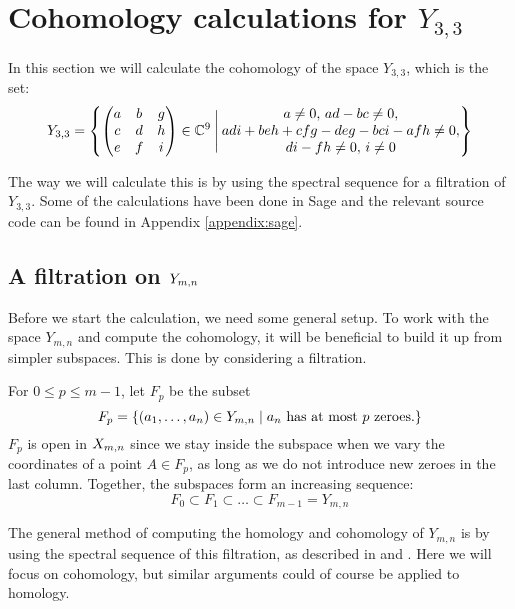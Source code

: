 


\chapter{Cohomology calculations for $Y_{3,3}$}
\label{chapter:udregninger}

In this section we will calculate the cohomology of the space
$Y_{3,3}$, which is the set:
\[ Y_{3,3} = \left\{ 
  \begin{pmatrix}
    a & b & g \\
    c & d & h \\
    e & f & i
  \end{pmatrix} \in \mathbb{C}^9 \:\Bigg\vert\: 
  \begin{matrix}
    a\neq 0,\, ad-bc \neq 0, \\
    adi+beh+cfg-deg-bci-afh \neq 0, \\
    di-fh \neq 0,\, i \neq 0
  \end{matrix}  \right\} \]

The way we will calculate this is by using the spectral sequence for
a filtration of $Y_{3,3}$. Some of the calculations have
been done in Sage and the relevant source code can be found in
Appendix \ref{appendix:sage}.

\section{A filtration on $Y_{m,n}$}

Before we start the calculation, we need some general setup. To work
with the space $Y_{m,n}$ and compute the cohomology, it will
be beneficial to build it up from simpler subspaces. This is done by
considering a filtration.

For $0 \leq p \leq m-1$, let $F_p$ be the subset
\[ F_p=\left\{  (a_1,\dots,a_n) \in Y_{m,n} \mid a_n \text{ has at most } p
  \text{ zeroes}. \right\} \]
$F_p$ is open in $X_{m,n}$ since we stay inside the subspace when we
vary the coordinates of a point $A\in F_p$, as long as we do not
introduce new zeroes in the last column.
Together, the subspaces form an increasing sequence:
\[ F_0 \subset F_1 \subset \dots \subset F_{m-1} = Y_{m,n} \]

The general method of computing the homology and cohomology of
$Y_{m,n}$ is by using the spectral sequence of this
filtration, as described in \cite{hatcherss} and
\cite{mccleary}. Here we will focus on
cohomology, but similar arguments could of course be applied to
homology.

